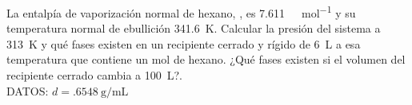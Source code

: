 La entalpía de vaporización normal de hexano, , es \SI{7,611}{\kilo\calorie\per\mol} y su temperatura normal de ebullición \SI{341,6}{\kelvin}. Calcular la presión del sistema a \SI{313}{\kelvin} y qué fases existen en un recipiente cerrado y rígido de \SI{6}{\liter} a esa temperatura que contiene un mol de hexano. ¿Qué fases existen si el volumen del recipiente cerrado cambia a \SI{100}{\liter}?.\\DATOS: $d=\SI{,6548}{\gram\per\milli\liter}$

